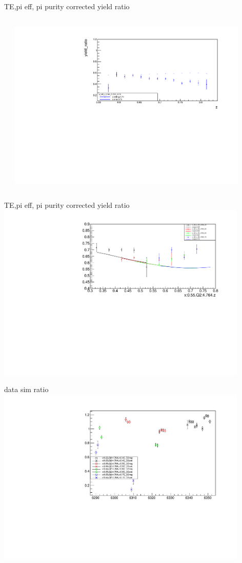 \begin{frame}{TE,pi eff, pi purity corrected yield ratio}
\begin{columns}
\begin{column}[T]{0.5\textwidth}
\end{column}
\begin{column}[T]{0.5\textwidth}
\includegraphics[width = 0.9\textwidth]{results/yield/statistics_corr/x_Q2_z_55_4764_70_ratio.pdf}
\end{column}
\end{columns}
\end{frame}
\begin{frame}{TE,pi eff, pi purity corrected yield ratio}
\includegraphics[width = 0.9\textwidth]{results/yield/statistics_corr/x_Q2_55_4764_ratio.pdf}
\end{frame}
\begin{frame}{data sim ratio}
    \includegraphics[width = 0.9\textwidth]{results/yield/run_info_pdf/x_Q2_55_4764_data_simc_ratio.pdf}
\end{frame}
